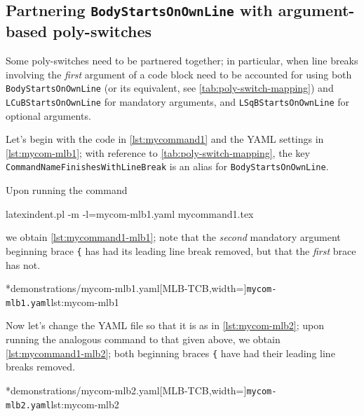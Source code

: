 \subsection{Partnering \texttt{BodyStartsOnOwnLine} with argument-based poly-switches}
	Some poly-switches need to be partnered together; in particular, when line breaks involving the \emph{first} argument
	of a code block need to be accounted for using both \texttt{BodyStartsOnOwnLine} (or its equivalent, see \vref{tab:poly-switch-mapping})
	and \texttt{LCuBStartsOnOwnLine} for mandatory arguments, and \texttt{LSqBStartsOnOwnLine} for optional arguments.

	Let's begin with the code in \cref{lst:mycommand1} and the YAML settings in \cref{lst:mycom-mlb1}; with reference
	to \vref{tab:poly-switch-mapping}, the key \texttt{CommandNameFinishesWithLineBreak} is an alias for \texttt{BodyStartsOnOwnLine}.


	Upon running the command
	\begin{commandshell}
latexindent.pl -m -l=mycom-mlb1.yaml mycommand1.tex
\end{commandshell}
	we obtain \cref{lst:mycommand1-mlb1}; note that the \emph{second} mandatory argument beginning brace \lstinline!{! has had
	its leading line break removed, but that the \emph{first} brace has not.

	\begin{minipage}{.4\linewidth}
	\end{minipage}
	\hfill
	\begin{minipage}{.55\linewidth}
		\cmhlistingsfromfile[style=yaml-LST]*{demonstrations/mycom-mlb1.yaml}[MLB-TCB,width=\linewidth]{\texttt{mycom-mlb1.yaml}}{lst:mycom-mlb1}
	\end{minipage}

	Now let's change the YAML file so that it is as in \cref{lst:mycom-mlb2}; upon running the analogous command to that given above,
	we obtain \cref{lst:mycommand1-mlb2}; both beginning braces \lstinline!{! have had their leading line breaks removed.

	\begin{minipage}{.4\linewidth}
	\end{minipage}
	\hfill
	\begin{minipage}{.55\linewidth}
		\cmhlistingsfromfile[style=yaml-LST]*{demonstrations/mycom-mlb2.yaml}[MLB-TCB,width=\linewidth]{\texttt{mycom-mlb2.yaml}}{lst:mycom-mlb2}
	\end{minipage}

